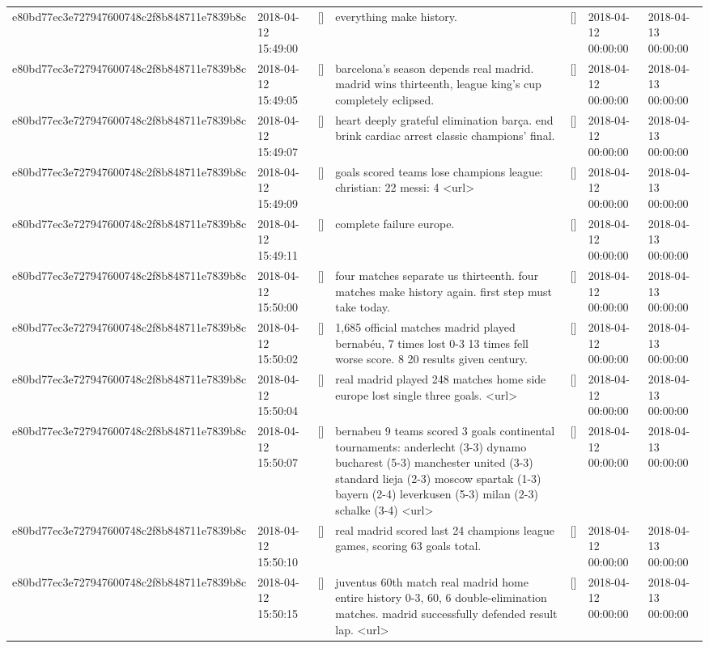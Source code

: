 \begin{tabular}{lllllll}
e80bd77ec3e727947600748c2f8b848711e7839b8c & 2018-04-12 15:49:00 & [] & everything make history. & [] & 2018-04-12 00:00:00 & 2018-04-13 00:00:00 \\
e80bd77ec3e727947600748c2f8b848711e7839b8c & 2018-04-12 15:49:05 & [] & barcelona's season depends real madrid. madrid wins thirteenth, league king's cup completely eclipsed. & [] & 2018-04-12 00:00:00 & 2018-04-13 00:00:00 \\
e80bd77ec3e727947600748c2f8b848711e7839b8c & 2018-04-12 15:49:07 & [] & heart deeply grateful elimination barça. end brink cardiac arrest classic champions' final. & [] & 2018-04-12 00:00:00 & 2018-04-13 00:00:00 \\
e80bd77ec3e727947600748c2f8b848711e7839b8c & 2018-04-12 15:49:09 & [] & goals scored teams lose champions league: christian: 22 messi: 4 <url> & [] & 2018-04-12 00:00:00 & 2018-04-13 00:00:00 \\
e80bd77ec3e727947600748c2f8b848711e7839b8c & 2018-04-12 15:49:11 & [] & complete failure europe. & [] & 2018-04-12 00:00:00 & 2018-04-13 00:00:00 \\
e80bd77ec3e727947600748c2f8b848711e7839b8c & 2018-04-12 15:50:00 & [] & four matches separate us thirteenth. four matches make history again. first step must take today. & [] & 2018-04-12 00:00:00 & 2018-04-13 00:00:00 \\
e80bd77ec3e727947600748c2f8b848711e7839b8c & 2018-04-12 15:50:02 & [] & 1,685 official matches madrid played bernabéu, 7 times lost 0-3 13 times fell worse score. 8 20 results given century. & [] & 2018-04-12 00:00:00 & 2018-04-13 00:00:00 \\
e80bd77ec3e727947600748c2f8b848711e7839b8c & 2018-04-12 15:50:04 & [] & real madrid played 248 matches home side europe lost single three goals. <url> & [] & 2018-04-12 00:00:00 & 2018-04-13 00:00:00 \\
e80bd77ec3e727947600748c2f8b848711e7839b8c & 2018-04-12 15:50:07 & [] & bernabeu 9 teams scored 3 goals continental tournaments: anderlecht (3-3) dynamo bucharest (5-3) manchester united (3-3) standard lieja (2-3) moscow spartak (1-3) bayern (2-4) leverkusen (5-3) milan (2-3) schalke (3-4) <url> & [] & 2018-04-12 00:00:00 & 2018-04-13 00:00:00 \\
e80bd77ec3e727947600748c2f8b848711e7839b8c & 2018-04-12 15:50:10 & [] & real madrid scored last 24 champions league games, scoring 63 goals total. & [] & 2018-04-12 00:00:00 & 2018-04-13 00:00:00 \\
e80bd77ec3e727947600748c2f8b848711e7839b8c & 2018-04-12 15:50:15 & [] & juventus 60th match real madrid home entire history 0-3, 60, 6 double-elimination matches. madrid successfully defended result lap. <url> & [] & 2018-04-12 00:00:00 & 2018-04-13 00:00:00 \\

\end{tabular}
